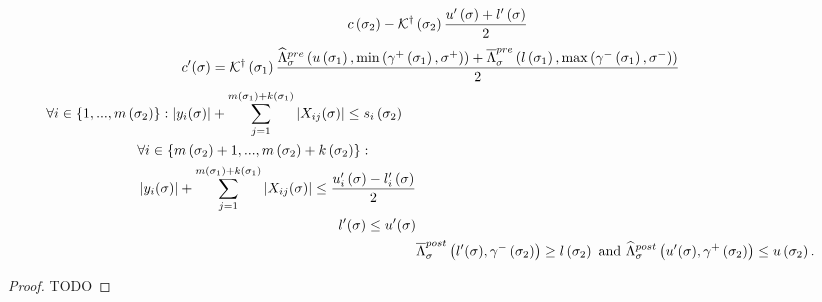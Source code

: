 \begin{lemma}
\begin{align}
\begin{split}
c\left(\sigma_{2}\right) - \mathcal{K}^\dagger\left(\sigma_{2}\right)\frac{u^\prime\left(\sigma\right)+l^\prime\left(\sigma\right)}{2}\\
\end{split}
\end{align}
\begin{align}
\begin{split}
& c^\prime(\sigma) = \mathcal{K}^\dagger\left(\sigma_{1}\right)\frac{\widehat{\Lambda}_{\sigma}^{pre}\left(u\left(\sigma_{1}\right),\min\left(\gamma^+\left(\sigma_{1}\right),\sigma^+\right)\right)+
\overline{\Lambda}_{\sigma}^{pre}\left(l\left(\sigma_{1}\right),\max\left(\gamma^-\left(\sigma_{1}\right),\sigma^-\right)\right)}{2}
\end{split}
\end{align}
\begin{align}
\begin{split}
& \forall i\in \{1,...,m\left(\sigma_{2}\right)\}:
 \left|y_i(\sigma)\right|+\sum_{j=1}^{m\left(\sigma_{1}\right)+k\left(\sigma_{1}\right)}\left|X_{ij}(\sigma)\right|\leq s_i\left(\sigma_{2}\right)
\end{split}\\
\begin{split}
& \forall i\in
\left\{m\left(\sigma_{2}\right)+1,...,m\left(\sigma_{2}\right)+k\left(\sigma_{2}\right)\right\}:\\
&\left|y_i(\sigma)\right|+\sum_{j=1}^{m\left(\sigma_{1}\right)+k\left(\sigma_{1}\right)}\left|X_{ij}(\sigma)\right|\leq \frac{u^\prime_i\left(\sigma\right)-l^\prime_i\left(\sigma\right)}{2}
\end{split}\\
\begin{split}
l^\prime(\sigma)\leq u^\prime(\sigma)
\end{split}\\
& \overline{\Lambda}_{\sigma}^{post}\left(l^\prime(\sigma),\gamma^-\left(\sigma_{2}\right)\right)\geq
l\left(\sigma_{2}\right)~\text{and}~\widehat{\Lambda}_{\sigma}^{post}\left(u^\prime(\sigma),\gamma^+\left(\sigma_{2}\right)\right)\leq u\left(\sigma_{2}\right).
\end{align}
\end{lemma}
\begin{proof}
{\color{red} TODO}
\end{proof}

